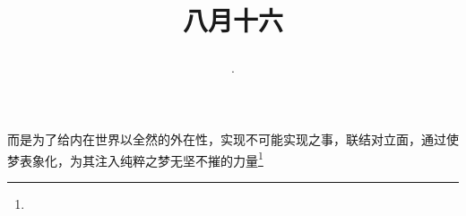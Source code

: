 \title{\date[d=18,m=9,y=2024][year:cn-y,年,month:cn,day:cn,日,·,weekday]·八月十六 }
而是为了给内在世界以全然的外在性，实现不可能实现之事，联结对立面，通过使梦表象化，为其注入纯粹之梦无坚不摧的力量\footnote{ }

